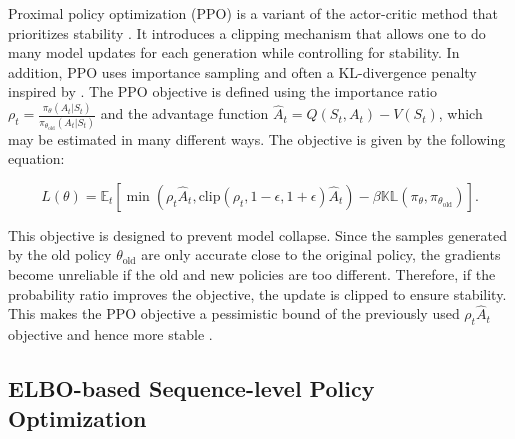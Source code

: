 
Proximal policy optimization (PPO) is a variant of the actor-critic method that prioritizes stability \cite{schulman2017proximalpolicyoptimizationalgorithms}. It introduces a clipping mechanism that allows one to do many model updates for each generation while controlling for stability. In addition, PPO uses importance sampling and often a KL-divergence penalty inspired by \cite{schulman2017trustregionpolicyoptimization}. The PPO objective is defined using the importance ratio $\rho_t = \frac{\pi_\theta(A_t | S_t)}{\pi_{\theta_\text{old}}(A_t | S_t)}$ and the advantage function $\hat{A}_t = Q(S_t, A_t) - V(S_t)$, which may be estimated in many different ways. The objective is given by the following equation:

\begin{equation*}
    L(\theta) = \mathbb{E}_t[\min(\rho_t\hat{A}_t, \text{clip}(\rho_t, 1 - \epsilon, 1 + \epsilon)\hat{A}_t) - \beta\mathbb{KL}(\pi_\theta, \pi_{\theta_\text{old}})].
\end{equation*}

This objective is designed to prevent model collapse. Since the samples generated by the old policy $\theta_\text{old}$ are only accurate close to the original policy, the gradients become unreliable if the old and new policies are too different. Therefore, if the probability ratio improves the objective, the update is clipped to ensure stability. This makes the PPO objective a pessimistic bound of the previously used $\rho_t\hat{A}_t$ objective and hence more stable \cite{schulman2017proximalpolicyoptimizationalgorithms}.




\subsection{ELBO-based Sequence-level Policy Optimization}


